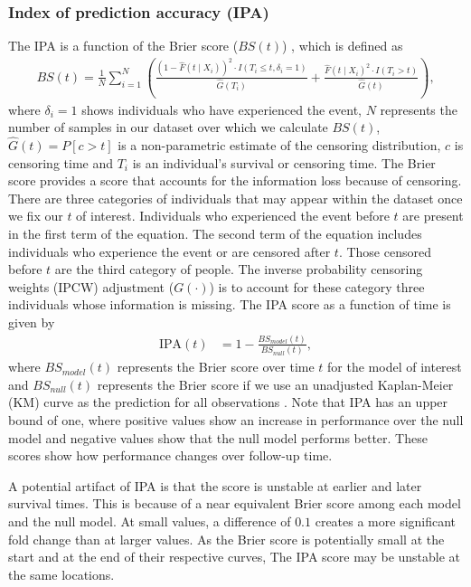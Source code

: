 \documentclass[APA,LATO1COL]{WileyNJD-v2}
\begin{document}
\hypertarget{index-of-prediction-accuracy-ipa}{%
\subsubsection{Index of prediction accuracy (IPA)}\label{index-of-prediction-accuracy-ipa}}

The IPA is a function of the Brier score (\(BS(t)\)) \citep{graf1999},
which is defined as \begin{align}
BS(t)=\frac{1}{N}\sum^{N}_{i=1}\left(\frac{\left(1 - \widehat{F}(t \mid X_{i})\right)^{2}\cdot I(T_{i}\leq t,\delta_{i}=1)}{\widehat{G}(T_{i})} + \frac{\widehat{F}(t\mid X_{i})^{2}\cdot I(T_{i}>t)}{\widehat{G}(t)}\right),
\end{align} where \(\delta_{i}=1\) shows individuals who have
experienced the event, \(N\) represents the number of samples in our
dataset over which we calculate \(BS(t)\), \(\widehat{G}(t)=P[c>t]\) is
a non-parametric estimate of the censoring distribution, \(c\) is
censoring time and \(T_{i}\) is an individual's survival or censoring
time. The Brier score provides a score that accounts for the information
loss because of censoring. There are three categories of individuals
that may appear within the dataset once we fix our \(t\) of interest.
Individuals who experienced the event before \(t\) are present in the
first term of the equation. The second term of the equation includes
individuals who experience the event or are censored after \(t\). Those
censored before \(t\) are the third category of people. The inverse
probability censoring weights (IPCW) adjustment (\(G(\cdot)\)) is to
account for these category three individuals whose information is
missing. The IPA score as a function of time is given by \begin{align}
\textrm{IPA}(t) &= 1-\frac{BS_{model}(t)}{BS_{null}(t)}, \nonumber
\end{align} where \(BS_{model}(t)\) represents the Brier score over time
\(t\) for the model of interest and \(BS_{null}(t)\) represents the
Brier score if we use an unadjusted Kaplan-Meier (KM) curve as the
prediction for all observations \citep{kattan2018index}. Note that IPA
has an upper bound of one, where positive values show an increase in
performance over the null model and negative values show that the null
model performs better. These scores show how performance changes over
follow-up time.

A potential artifact of IPA is that the score is unstable at earlier and
later survival times. This is because of a near equivalent Brier score
among each model and the null model. At small values, a difference of
\(0.1\) creates a more significant fold change than at larger values. As
the Brier score is potentially small at the start and at the end of
their respective curves, The IPA score may be unstable at the same
locations.
\end{document}
